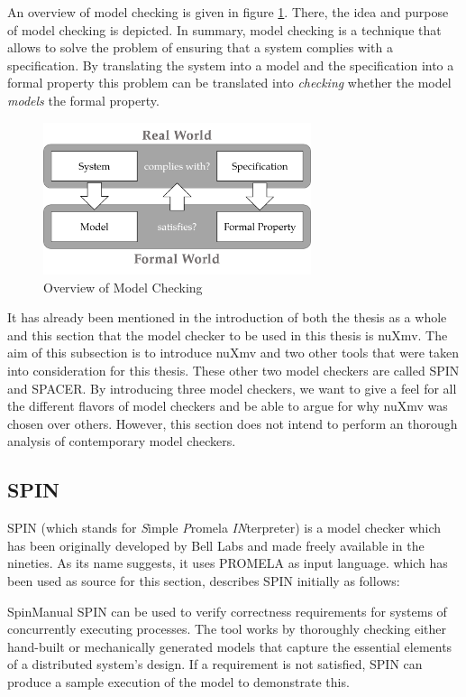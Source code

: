 An overview of model checking is given in figure \ref{fig:model-checking}.
There, the idea and purpose of model checking is depicted.
In summary, model checking is a technique that allows to solve the problem of ensuring that a system complies with a specification.
By translating the system into a model and the specification into a formal property this problem can be translated into \textit{checking} whether the model \textit{models} the formal property.

\begin{figure}
    \centering
    \includegraphics[width=0.7\textwidth]{figures/model-checking.png}
    \caption{Overview of Model Checking}
    \label{fig:model-checking}
\end{figure}

It has already been mentioned in the introduction of both the thesis as a whole and this section that the model checker to be used in this thesis is nuXmv.
The aim of this subsection is to introduce nuXmv and two other tools that were taken into consideration for this thesis.
These other two model checkers are called SPIN and SPACER.
By introducing three model checkers, we want to give a feel for all the different flavors of model checkers and be able to argue for why nuXmv was chosen over others.
However, this section does not intend to perform an thorough analysis of contemporary model checkers.

\subsection{SPIN}
\label{sec:spin}

SPIN (which stands for \textit{S}imple \textit{P}romela \textit{IN}terpreter) is a model checker which has been originally developed by Bell Labs and made freely available in the nineties.
As its name suggests, it uses PROMELA as input language.
 \cite{SpinManual} which has been used as source for this section, describes SPIN initially as follows:
\begin{displaycquote}[p.1]{SpinManual}
    SPIN can be used to verify correctness requirements for systems of concurrently executing processes.
    The tool works by thoroughly checking either hand-built or mechanically generated models that capture the essential elements of a distributed system's design.
    If a requirement is not satisfied, SPIN can produce a sample execution of the model to demonstrate this.
\end{displaycquote}

